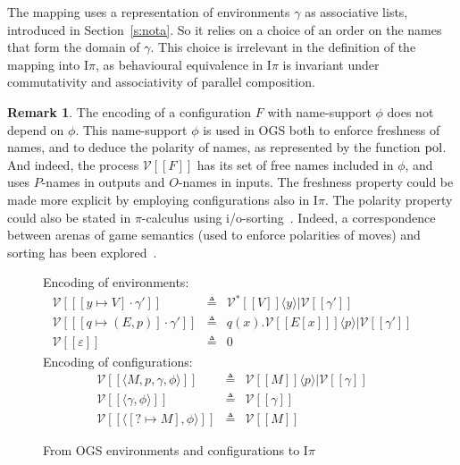\documentclass[11pt,a4paper]{amsart}
\theoremstyle{plain}
\theoremstyle{definition}
\theoremstyle{defC}
\theoremstyle{thmC}
\theoremstyle{plain}
\numberwithin{equation}{section}
\newcommand{\pairP}[1]{  #1 }      %
\newcommand{\obj}[1]{\langle #1 \rangle}
\def\nil{0}
\def\inp#1#2{#1(#2)}
\def\app#1#2{#1\obj{#2}}                    %
\def\Mybar{{\center \rule{\hsize}{0.5mm}}} %
\def\Mybar{}
\newcommand{\FF}{F}
\newcommand{\encoI}[1]{\cbvSymb [\! [ #1 ] \! ]  }
\newcommand{\encoIa}[2]{\cbvSymb \app{[\! [ #1 ] \! ]}{#2}  }
\newcommand{\encoIVa}[2]{\cbvSymb^\variant \app{[\! [ #1 ] \! ]}{#2}  }
\newcommand{\cbvSymb}{{\mathcal {V}}}
\newcommand{\encoEnvI}[1]{ \cbvSymb[\! [ #1 ] \! ]  } %
\newcommand{\encoConI}{\encoEnvI} %
\newcommand{\variant}{*} %
\newcommand{\myptD}{2pt}
\newcommand{\Intp}{\mbox{I$\pi$}\xspace}   %
\newcommand{\piI}{\Intp}   %
\newcommand{\defeq}{\mathrel{\triangleq}}
\newcommand{\emptymap}{\varepsilon}
\newcommand{\pmap}[2]{[#1 \mapsto #2]}
\newcommand{\conf}[1]{\langle #1\rangle}
\newcommand{\initconf}[2]{\langle[? \mapsto #2], #1\rangle}
\newcommand{\Label}{{\rm pol}}
\theoremstyle{plain}
\theoremstyle{definition}
\newtheorem{remark}[thm]{Remark}
\begin{document}
The mapping uses a representation of environments $\gamma$ as associative lists, introduced in
Section~\ref{s:nota}.
So it relies on a choice of an order on the names that form the domain of $\gamma$.
This choice is irrelevant in the definition of the mapping into \piI, as behavioural equivalence in
\piI is invariant under commutativity and associativity of parallel composition.

\begin{remark}
 The  encoding of a configuration $\FF$ with name-support $\phi$ 
does not depend on $\phi$.
This name-support $\phi$ is used in OGS both to enforce freshness of names,
and to deduce the polarity of names,
as represented by the function $\Label$.
And indeed, the process $\encoConI{\FF}$ has its set of free names included
in $\phi$, and uses $P$-names in outputs and $O$-names in inputs.
The freshness property could be made more explicit by employing configurations also in \piI.
The polarity property could also be stated in $\pi$-calculus using 
i/o-sorting~\cite{PiSa96b}.
Indeed, a correspondence between arenas of game semantics (used to enforce polarities of moves) 
and sorting has  been 
explored~\cite{10.1145/224164.224189,10.1016/S0304-3975-99-00039-0}.
\end{remark}


\begin{figure}
Encoding of environments: \hfill   $ $ %
\[ 
\begin{array}{rcl}
\encoEnvI{\pmap{y}{V}\cdot\gamma'  } & \defeq & \encoIVa {V} y | \encoEnvI{\gamma'  }
\\[\myptD] 
\encoEnvI{\pmap{q}{(E,p)}\cdot\gamma'  } & \defeq & 
\inp qx .\encoIa {E[x]} p  | \encoEnvI{\gamma'  } \\[\myptD]
\encoEnvI{ \emptymap} & \defeq & \nil
\end{array} 
\]
Encoding of configurations: \hfill  $ $ %
\[ 
\begin{array}{rcl}
\encoConI{ \conf{M,p,\gamma, \phi}}
& \defeq &   %
\encoIa {M} p | \encoEnvI \gamma 
\\[\myptD]
 \encoConI{ \conf{\gamma, \phi}}& \defeq & %
 \encoEnvI \gamma  
\\[\myptD]
 \encoConI{ \initconf{\phi}{M}} & \defeq &  %
 \encoI   M
\end{array}
 \] 
\caption{From OGS environments and configurations to \piI }
\label{f:OGS_pi_cbv}
\end{figure} 
\end{document}
